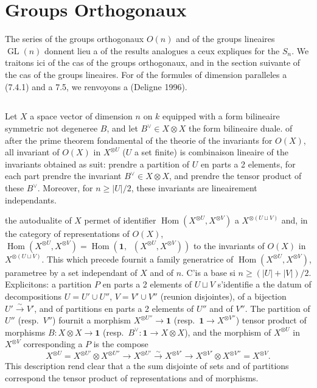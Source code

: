 \documentclass[11pt,a4paper]{article}
\theoremstyle{plain}
\theoremstyle{definition}
\DeclareMathOperator{\Hom}{Hom}
\DeclareMathOperator{\GL}{GL}
\newcommand{\isom}{\xrightarrow{\sim}}
\DeclareMathOperator{\iHom}{\underline{Hom}}
\begin{document}
\section{Groups Orthogonaux}

The series of the groups orthogonaux $O(n)$ and of the groups lineaires $\GL(n)$ donnent lieu a of the results analogues a ceux expliques for the $S_n$. We traitons ici of the cas of the groups orthogonaux, and in the section suivante of the cas of the groups lineaires. For of the formules of dimension paralleles a (7.4.1) and a 7.5, we renvoyons a (Deligne 1996).

\subsection{}
Let $X$ a space vector of dimension $n$ on $k$ equipped with a form bilineaire symmetric not degeneree $B$, and let $B^\vee \in X \otimes X$ the form bilineaire duale. of after the prime theorem fondamental of the theorie of the invariants for $O(X)$, all invariant of $O(X)$ in $X^{\otimes U}$ ($U$ a set finite) is combinaison lineaire of the invariants obtained as suit: prendre a partition of $U$ en parts a 2 elements, for each part prendre the invariant $B^\vee \in X \otimes X$, and prendre the tensor product of these $B^\vee$. Moreover, for $n \geq |U|/2$, these invariants are lineairement independants.

the autodualite of $X$ permet of identifier $\Hom(X^{\otimes U}, X^{\otimes V})$ a $X^{\otimes (U \sqcup V)}$ and, in the category of representations of $O(X)$, $\Hom(X^{\otimes U}, X^{\otimes V}) = \Hom(\mathbf{1}, \iHom(X^{\otimes U}, X^{\otimes V}))$ to the invariants of $O(X)$ in $X^{\otimes (U \sqcup V)}$. This which precede fournit a family generatrice of $\Hom(X^{\otimes U}, X^{\otimes V})$, parametree by a set independant of $X$ and of $n$. C'is a base si $n \geq (|U| + |V|)/2$. Explicitons: a partition $P$ en parts a 2 elements of $U \sqcup V$ s'identifie a the datum of decompositions $U = U' \cup U''$, $V = V' \cup V''$ (reunion disjointes), of a bijection $U' \isom V'$, and of partitions en parts a 2 elements of $U''$ and of $V''$. The partition of $U''$ (resp.~$V''$) fournit a morphism $X^{\otimes U''} \to \mathbf{1}$ (resp.~$\mathbf{1} \to X^{\otimes V''}$) tensor product of morphisms $B : X \otimes X \to \mathbf{1}$ (resp.~$B^\vee : \mathbf{1} \to X \otimes X$), and the morphism of $X^{\otimes U}$ in $X^{\otimes V}$ corresponding a $P$ is the compose
\[
X^{\otimes U} = X^{\otimes U'} \otimes X^{\otimes U''} \to X^{\otimes U'} \isom X^{\otimes V'} \to X^{\otimes V'} \otimes X^{\otimes V''} = X^{\otimes V}.
\]
This description rend clear that a the sum disjointe of sets and of partitions correspond the tensor product of representations and of morphisms.
\end{document}

